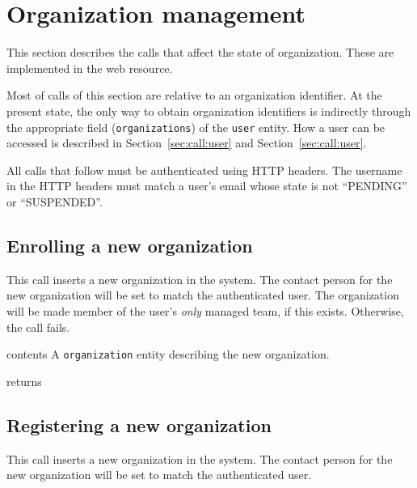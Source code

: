 \section{Organization management}
\label{sec:call:organization}

This section describes the calls that affect the state of organization. These
are implemented in the
web resource.

Most of calls of this section are relative to an organization identifier. At the
present state, the only way to obtain organization identifiers is indirectly
through the appropriate field (\texttt{organizations}) of the \texttt{user}
entity. How a user can be accessed is described in Section~\ref{sec:call:user}
and Section~\ref{sec:call:user}. 

All calls that follow must be authenticated using HTTP headers. The username in
the HTTP headers must match a user's email whose state is not ``PENDING'' or
``SUSPENDED''.


\subsection{Enrolling a new organization}

This call inserts a new organization in the system. The contact person for the
new organization will be set to match the authenticated user. The organization
will be made member of the user's \emph{only} managed team, if this exists.
Otherwise, the call fails.

\begin{apidata}{contents}
  A \texttt{organization} entity describing the new organization.
\end{apidata}
\begin{apidata}{returns}
  \begin{datalist}
  \end{datalist}
\end{apidata}

\subsection{Registering a new organization}

This call inserts a new organization in the system. The contact person for the
new organization will be set to match the authenticated user.


